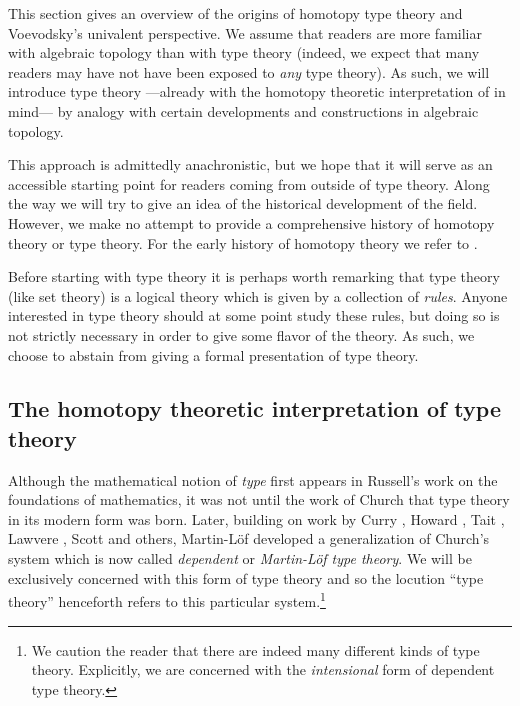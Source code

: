 \documentclass[11pt]{amsart}
\theoremstyle{definition}
\theoremstyle{remark}
\numberwithin{equation}{section}
\begin{document}
This section gives an overview of the origins of homotopy type
theory and Voevodsky's univalent perspective.  We assume that
readers are more familiar with algebraic topology than with type
theory (indeed, we expect that many readers may have not have been
exposed to \emph{any} type theory).  As such, we will introduce type
theory ---already with the homotopy theoretic interpretation of \cite{Awodey:2009bz,Voevodsky:2009} in mind--- by analogy with certain developments and constructions
in algebraic topology.  

This approach is admittedly anachronistic, but
we hope that it will serve as an accessible starting point for readers
coming from outside of type theory.  Along the way we will try to give
an idea of the historical development of the field.  However, we make
no attempt to provide a comprehensive history of homotopy theory or type theory.
For the early history of homotopy theory we refer to
\cite{Dieudonne:2009dv}.

Before starting with type theory it is perhaps worth remarking that
type theory (like set theory) is a logical theory which is given by a
collection of \emph{rules}.  Anyone interested in type theory
should at some point study these rules, but doing so is not
strictly necessary in order to give some flavor of the theory.  As
such, we choose to abstain from giving a formal presentation of type
theory.

\subsection{The homotopy theoretic interpretation of type theory}\label{sec:homotopy_interp}

Although the mathematical notion of \emph{type} first appears in
Russell's \cite{Russell:1903wn} work on the
foundations of mathematics, it was not until the work of Church
\cite{Church:1940tu} that type theory in its modern form was born.
Later, building on work by Curry \cite{Curry:1934vy}, Howard \cite{Howard:FTNC}, Tait
\cite{Tait}, Lawvere \cite{Lawvere:2006tl},
Scott \cite{Scott:1970vu} and others, Martin-L\"{o}f
\cite{MartinLof:1998tw,MartinLof:1975tb,MartinLof:1982bn,MartinLof:1984tr}
developed a generalization of Church's system which is now called
\emph{dependent} or \emph{Martin-L\"{o}f type theory}. We will be
exclusively concerned with this form of type theory and so the
locution ``type theory'' henceforth refers to this particular
system.\footnote{We caution the reader that there are indeed many
  different kinds of type theory.  Explicitly, we are concerned with
  the \emph{intensional} form of dependent type theory.}
\end{document}
